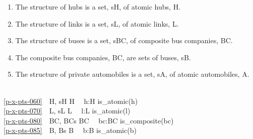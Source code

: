 \HHHH
\begin{enumerate}\setei
\item \label{p-x-pts-060} The structure of hubs is a set, \textsf{sH},  
                        of atomic hubs, \textsf{H}.  
\item \label{p-x-pts-070} The structure of links is a set, \textsf{sL}, of atomic
                        links, \textsf{L}.     
\item \label{p-x-pts-080} The structure of buses is a set, \textsf{sBC},
                        of composite bus companies, \textsf{BC}.
                           
\item \label{p-x-pts-085} The composite bus companies, \textsf{BC}, are sets of
                        buses, \textsf{sB}.   
\item \label{p-x-pts-090} The structure of private automobiles is a set, \textsf{sA},
                        of atomic automobiles, \textsf{A}.  
\savei\end{enumerate}\footsize\HHHH
\pos{\psno}{\mnewfoil} 
\bp
{}\\
\ref{p-x-pts-060}\ \ H, sH {\EQ} H\ \  {\ALL} h:H {\RDOT} is\_atomic(h)\\
\ref{p-x-pts-070}\ \ L, sL {\EQ} L\ \  {\ALL} l:L {\RDOT} is\_atomic(l)\ \ \ \\
\ref{p-x-pts-080}\ \ BC, BCs {\EQ} BC\ \  {\ALL} bc:BC {\RDOT} is\_composite(bc)\\
\ref{p-x-pts-085}\ \ B, Bs {\EQ} B\ \  {\ALL} b:B {\RDOT} is\_atomic(b)\\
